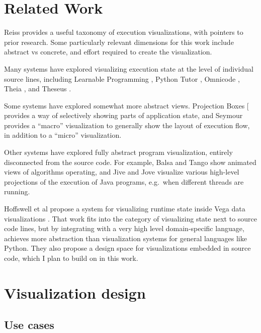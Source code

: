 \documentclass{sigchi}
\begin{document}
\hypertarget{sec:related-work}{%
\section{Related Work}\label{sec:related-work}}

Reiss \autocite{reiss2007} provides a useful taxonomy of execution
visualizations, with pointers to prior research. Some particularly
relevant dimensions for this work include abstract vs concrete, and
effort required to create the visualization.

Many systems have explored visualizing execution state at the level of
individual source lines, including Learnable Programming
\autocite{victora}, Python Tutor \autocite{guo2013}, Omnicode
\autocite{kang2017}, Theia \autocite{pollock2019}, and Theseus
\autocite{lieber2014}.

Some systems have explored somewhat more abstract views. Projection
Boxes {[}\textcite{lerner2020} provides a way of selectively showing
parts of application state, and Seymour \autocite{kasibatla2018}
provides a ``macro'' visualization to generally show the layout of
execution flow, in addition to a ``micro'' visualization.

Other systems have explored fully abstract program visualization,
entirely disconnected from the source code. For example, Balsa
\autocite{brown1984} and Tango \autocite{stasko1990} show animated views
of algorithms operating, and Jive \autocite{reiss2003} and Jove
\autocite{reiss2005} visualize various high-level projections of the
execution of Java programs, e.g.~when different threads are running.

Hoffswell et al propose a system for visualizing runtime state inside
Vega data visualizations \autocite{hoffswell2018a}. That work fits into
the category of visualizing state next to source code lines, but by
integrating with a very high level domain-specific language, achieves
more abstraction than visualization systems for general languages like
Python. They also propose a design space for visualizations embedded in
source code, which I plan to build on in this work.

\hypertarget{sec:design}{%
\section{Visualization design}\label{sec:design}}

\hypertarget{use-cases}{%
\subsection{Use cases}\label{use-cases}}
\end{document}
